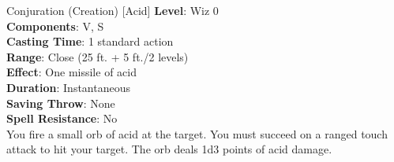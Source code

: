 {Conjuration (Creation) [Acid]}
{
	\textbf{Level}: Wiz 0\\
	\textbf{Components}: V, S\\
	\textbf{Casting Time}: 1 standard action\\
	\textbf{Range}: Close (25 ft. + 5 ft./2 levels)\\
	\textbf{Effect}: One missile of acid\\
	\textbf{Duration}: Instantaneous\\
	\textbf{Saving Throw}: None\\
	\textbf{Spell Resistance}: No\\
}
{
	You fire a small orb of acid at the target. You must succeed on a ranged touch attack to hit your target. The orb deals 1d3 points of acid damage.
}